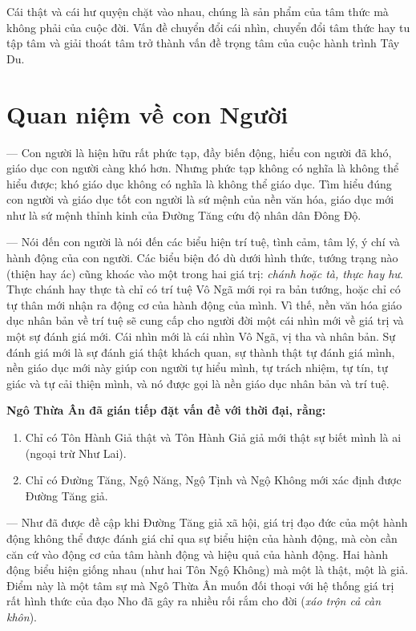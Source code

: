 Cái thật và cái hư quyện chặt vào nhau, chúng là sản phẩm của tâm thức mà không phải của cuộc đời. Vấn đề chuyển đổi cái nhìn, chuyển đổi tâm thức hay tu tập tâm và giải thoát tâm trở thành vấn đề trọng tâm của cuộc hành trình Tây Du.

\section{Quan niệm về con Người} %
\label{sec:56_57_con_nguoi}

— Con người là hiện hữu rất phức tạp, đầy biến động, hiểu con người đã khó, giáo dục con người càng khó hơn. Nhưng phức tạp không có nghĩa là không thể hiểu được; khó giáo dục không có nghĩa là không thể giáo dục. Tìm hiểu đúng con người và giáo dục tốt con người là sứ mệnh của nền văn hóa, giáo dục mới như là sứ mệnh thỉnh kinh của Đường Tăng cứu độ nhân dân Đông Độ.

— Nói đến con người là nói đến các biểu hiện trí tuệ, tình cảm, tâm lý, ý chí và hành động của con người. Các biểu biện đó dù dưới hình thức, tướng trạng nào (thiện hay ác) cũng khoác vào một trong hai giá trị: \emph{chánh hoặc tà, thực hay hư}. Thực chánh hay thực tà chỉ có trí tuệ Vô Ngã mới rọi ra bản tướng, hoặc chỉ có tự thân mới nhận ra động cơ của hành động của mình. Vì thế, nền văn hóa giáo dục nhân bản về trí tuệ sẽ cung cấp cho người đời một cái nhìn mới về giá trị và một sự đánh giá mới. Cái nhìn mới là cái nhìn Vô Ngã, vị tha và nhân bản. Sự đánh giá mới là sự đánh giá thật khách quan, sự thành thật tự đánh giá mình, nền giáo dục mới này giúp con người tự hiểu mình, tự trách nhiệm, tự tín, tự giác và tự cải thiện mình, và nó được gọi là nền giáo dục nhân bản và trí tuệ.

{\bf Ngô Thừa Ân đã gián tiếp đặt vấn đề với thời đại, rằng:}

\begin{enumerate}[label=\itshape\alph*\upshape/]
    \item Chỉ có Tôn Hành Giả thật và Tôn Hành Giả giả mới thật sự biết mình là ai (ngoại trừ Như Lai).

    \item Chỉ có Đường Tăng, Ngộ Năng, Ngộ Tịnh và Ngộ Không mới xác định được Đường Tăng giả.
\end{enumerate}

— Như đã được đề cập khi Đường Tăng giả xã hội, giá trị đạo đức của một hành động không thể được đánh giá chỉ qua sự biểu hiện của hành động, mà còn cần căn cứ vào động cơ của tâm hành động và hiệu quả của hành động. Hai hành động biểu hiện giống nhau (như hai Tôn Ngộ Không) mà một là thật, một là giả. Điểm này là một tâm sự mà Ngô Thừa Ân muốn đối thoại với hệ thống giá trị rất hình thức của đạo Nho đã gây ra nhiều rối rắm cho đời (\emph{xáo trộn cả càn khôn}).

